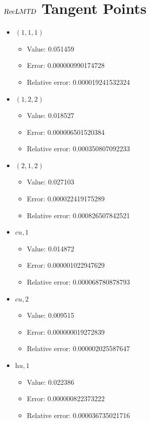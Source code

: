 \documentclass{article}%
\begin{document}
\section{$\textsl{RecLMTD}$ Tangent Points}%
\thispagestyle{plain}%
\begin{itemize}%
	\item $(1, 1, 1)$%
	\begin{itemize}%
		\item Value: 0.051459%
		\item Error: 0.000000990174728%
		\item Relative error: 0.000019241532324%
	\end{itemize}%
	\item $(1, 2, 2)$%
	\begin{itemize}%
		\item Value: 0.018527%
		\item Error: 0.000006501520384%
		\item Relative error: 0.000350807092233%
	\end{itemize}%
	\item $(2, 1, 2)$%
	\begin{itemize}%
		\item Value: 0.027103%
		\item Error: 0.000022419175289%
		\item Relative error: 0.000826507842521%
	\end{itemize}%
	\item $\textit{cu},1$%
	\begin{itemize}%
		\item Value: 0.014872%
		\item Error: 0.000001022947629%
		\item Relative error: 0.000068780878793%
	\end{itemize}%
	\item $\textit{cu},2$%
	\begin{itemize}%
		\item Value: 0.009515%
		\item Error: 0.000000019272839%
		\item Relative error: 0.000002025587647%
	\end{itemize}%
	\item $\textit{hu},1$%
	\begin{itemize}%
		\item Value: 0.022386%
		\item Error: 0.000000822373222%
		\item Relative error: 0.000036735021716%
	\end{itemize}%
\end{itemize}%
\end{document}
